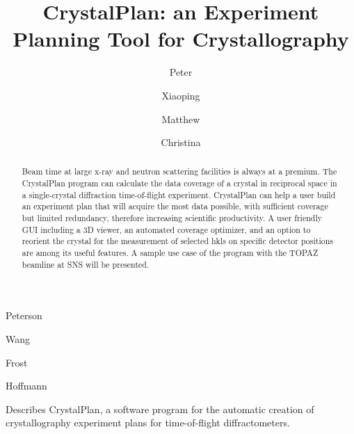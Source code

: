\documentclass[final]{iucr}              %
\begin{document}


\title{CrystalPlan: an Experiment Planning Tool for Crystallography}



\author[]{Peter}{Peterson}
\author[]{Xiaoping}{Wang}
\author[]{Matthew}{Frost}
\author[]{Christina}{Hoffmann}







\maketitle                        %

\begin{synopsis}
Describes CrystalPlan, a software program for the automatic creation of 
crystallography experiment plans for time-of-flight diffractometers.
\end{synopsis}

\begin{abstract}
Beam time at large x-ray and neutron scattering facilities is always at a premium.
The CrystalPlan program can calculate the data coverage of a crystal in reciprocal
space in a single-crystal diffraction time-of-flight experiment. CrystalPlan can 
help a user build an experiment plan that will acquire the most data possible, 
with sufficient coverage but limited redundancy, therefore increasing scientific 
productivity. 
A user friendly GUI including a 3D viewer, an automated coverage optimizer,
and an option to reorient the crystal for the measurement 
of selected hkls on specific detector positions 
are among its useful features. 
A sample use case of the program with the TOPAZ beamline at SNS will be
presented. 
\end{abstract}
\end{document}
